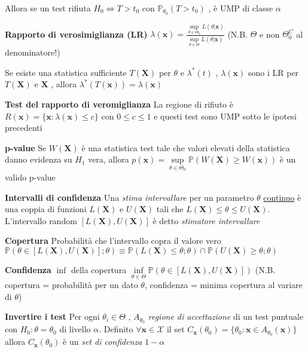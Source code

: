 \documentclass[openany]{book} %
\begin{document}
Allora se un test rifiuta $H_0\Leftrightarrow T>t_0$ con $\mathbb{P}_{\theta_0}(T>t_0)$ , è UMP di classe $\alpha$

\textbf{Rapporto di verosimiglianza (LR)} $\lambda(\boldsymbol{x})=\frac{\underset{\theta\in\Theta_0}{\sup}L(\theta|\boldsymbol{x})}{\underset{\theta\in\Theta}{\sup}L(\theta|\boldsymbol{x})}$ (N.B. $\Theta$ e non $\Theta_0^C$ al denominatore!)

Se esiste una statistica sufficiente $T(\boldsymbol{X})$ per $\theta$ e $\lambda^*(t)$ , $\lambda(\boldsymbol{x})$ sono i LR per $T(\boldsymbol{X})$ e $\boldsymbol{X}$ , allora $\lambda^*(T(\boldsymbol{x}))=\lambda(\boldsymbol{x})$

\textbf{Test del rapporto di veromiglianza} La regione di rifiuto è $R(\boldsymbol{x})=\{\boldsymbol{x}:\lambda(\boldsymbol{x})\leq c\}$ con $0\leq c\leq 1$ e questi test sono UMP sotto le ipotesi precedenti

\textbf{p-value} Se $W(\boldsymbol{X})$ è una statistica test tale che valori elevati della statistica danno evidenza su $H_1$ vera, allora $p(\boldsymbol{x})=\underset{\theta\in\Theta_0}{\sup}\mathbb{P}(W(\boldsymbol{X})\geq W(\boldsymbol{x}))$ è un valido p-value

\textbf{Intervalli di confidenza} Una \textit{stima intervallare} per un parametro $\theta$ \underline{continuo} è una coppia di funzioni $L(\boldsymbol{X})$ e $U(\boldsymbol{X})$ tali che $L(\boldsymbol{X})\leq\theta\leq U(\boldsymbol{X})$. L'intervallo random $[L(\boldsymbol{X}),U(\boldsymbol{X})]$ è detto \textit{stimatore intervallare}

\textbf{Copertura} Probabilità che l'intervallo copra il valore vero $\mathbb{P}(\theta\in[L(\boldsymbol{X}),U(\boldsymbol{X})];\theta)\equiv \mathbb{P}(L(\boldsymbol{X})\leq\theta;\theta)\cap\mathbb{P}(U(\boldsymbol{X})\geq\theta;\theta)$

\textbf{Confidenza} $\inf$ della copertura $\underset{\theta\in\Theta}{\inf}\mathbb{P}(\theta\in[L(\boldsymbol{X}),U(\boldsymbol{X})])$ (N.B. copertura = probabilità per un dato $\theta$, confidenza = minima copertura al variare di $\theta$)

\textbf{Invertire i test} Per ogni $\theta_i\in\Theta$ , $A_{\theta_0}$ \textit{regione di accettazione} di un test puntuale con $H_0:\theta=\theta_0$ di livello $\alpha$. Definito $\forall \boldsymbol{x}\in \mathcal{X}$ il set $C_{\boldsymbol{x}}(\theta_0)=\{\theta_0:\boldsymbol{x}\in A_{\theta_0}(\boldsymbol{x})\}$ allora $C_{\boldsymbol{x}}(\theta_0)$ è un \textit{set di confidenza} $1-\alpha$
\end{document}
